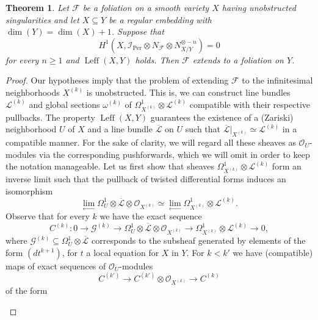 \documentclass[reqno]{amsart}
\theoremstyle{plain}
\newcommand{\I}{\mathcal{I}}
\newcommand{\OO}{\mathcal{O}}
\renewcommand{\I}{\mathcal{I}}
\renewcommand{\L}{\mathcal{L}}
\newcommand{\F}{\mathscr{F}}
\DeclareMathOperator{\Per}{Per}
\DeclareMathOperator{\Leff}{Leff}
\newcounter{Theorem}
\newtheorem{theorem}{Theorem}[section]
\theoremstyle{definition}
\theoremstyle{named}
\begin{document}
\begin{theorem}\label{ext:global}
   Let $\F$ be a foliation on a smooth variety $X$ having unobstructed singularities and let $X\subseteq Y$ be a regular embedding with $\dim(Y)=\dim(X)+1$.  
   Suppose that $$H^1(X,\I_{\Per}\otimes N_\F\otimes N_{X/Y}^{\otimes -n})=0$$
   for every $n\geqslant 1$ and $\Leff(X,Y)$ holds.
    Then $\F$ extends to a foliation on $Y$. 
\end{theorem}

\begin{proof}
Our hypotheses imply that the problem of extending $\F$ to the infinitesimal neighborhoods $X^{(k)}$ is unobstructed. This is, we can construct line bundles $\L^{(k)}$ and global sections $\omega^{(k)}$ of $\Omega^1_{X^{(k)}}\otimes \L^{(k)}$ compatible with their respective pullbacks. 
The property $\Leff(X,Y)$ guarantees the existence of a (Zariski) neighborhood $U$ of $X$ and a line bundle $\overline{\L}$ on $U$ such that $\overline{\L}\vert_{X^{(k)}}\simeq \L^{(k)}$ in a compatible manner. For the sake of clarity, we will regard all these sheaves as $\OO_U$-modules via the corresponding pushforwards, which we will omit in order to keep the notation manageable.
Let us first show that sheaves $\Omega^1_{X^{(k)}}\otimes \L^{(k)}$ form an inverse limit such that the pullback of twisted differential forms induces an isomorphism
\begin{equation}
    \label{isolim} \lim_{\longleftarrow}\Omega^1_U\otimes \overline{\L} \otimes \OO_{X^{(k)}} \simeq \lim_{\longleftarrow} \Omega^1_{X^{(k)}} \otimes \L^{(k)}.
\end{equation}
Observe that for every $k$ we have the exact sequence
$$C^{(k)}: 0\rightarrow \mathcal G^{(k)}\rightarrow \Omega^1_U\otimes\overline{\L}  \otimes \OO_{X^{(k)}} \rightarrow \Omega^1_{X^{(k)}} \otimes \L^{(k)} \rightarrow 0,$$
where $\mathcal G^{(k)}\subseteq \Omega^1_U\otimes\overline{\L}$  corresponds to the subsheaf generated by elements of the form $(dt^{k+1})$, for $t$ a local equation for $X$ in $Y$.
For $k<k'$ we have (compatible) maps of exact sequences of $\OO_U$-modules
$$C^{(k')}\to C^{(k')}\otimes \OO_{X^{(k)}}\to C^{(k)}$$ 
of the form
\begin{center}
\end{center}
\end{proof}
\end{document}
